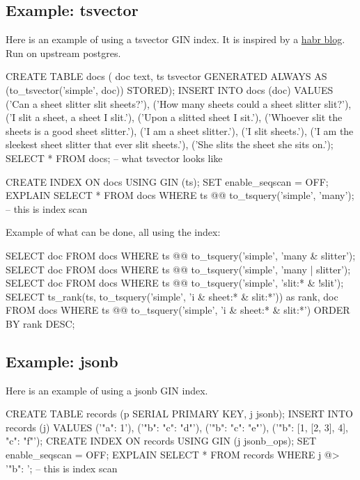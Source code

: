 \documentclass[11pt]{article}
\begin{document}
\hypertarget{example-tsvector}{%
\subsection{Example: tsvector}\label{example-tsvector}}

Here is an example of using a tsvector GIN index. It is inspired by a
\href{https://habr.com/en/company/postgrespro/blog/448746/}{habr blog}.
Run on upstream postgres.

\begin{sqlcode}
CREATE TABLE docs (
    doc text,
    ts tsvector GENERATED ALWAYS AS (to_tsvector('simple', doc)) STORED);
INSERT INTO docs (doc) VALUES
  ('Can a sheet slitter slit sheets?'),
  ('How many sheets could a sheet slitter slit?'),
  ('I slit a sheet, a sheet I slit.'),
  ('Upon a slitted sheet I sit.'),
  ('Whoever slit the sheets is a good sheet slitter.'),
  ('I am a sheet slitter.'),
  ('I slit sheets.'),
  ('I am the sleekest sheet slitter that ever slit sheets.'),
  ('She slits the sheet she sits on.');
SELECT * FROM docs; -- what tsvector looks like
\end{sqlcode}

\begin{sqlcode}
CREATE INDEX ON docs USING GIN (ts);
SET enable_seqscan = OFF;
EXPLAIN SELECT * FROM docs
    WHERE ts @@ to_tsquery('simple', 'many'); -- this is index scan
\end{sqlcode}

Example of what can be done, all using the index:

\begin{sqlcode}
SELECT doc FROM docs WHERE ts @@ to_tsquery('simple', 'many & slitter');
SELECT doc FROM docs WHERE ts @@ to_tsquery('simple', 'many | slitter');
SELECT doc FROM docs WHERE ts @@ to_tsquery('simple', 'slit:* & !slit');
SELECT ts_rank(ts, to_tsquery('simple', 'i & sheet:* & slit:*')) as rank, doc
    FROM docs
    WHERE ts @@ to_tsquery('simple', 'i & sheet:* & slit:*')
    ORDER BY rank DESC;
\end{sqlcode}

\hypertarget{example-jsonb}{%
\subsection{Example: jsonb}\label{example-jsonb}}

Here is an example of using a jsonb GIN index.

\begin{sqlcode}
CREATE TABLE records (p SERIAL PRIMARY KEY, j jsonb);
INSERT INTO records (j) VALUES
  ('{"a": 1}'),
  ('{"b": {"c": "d"}}'),
  ('{"b": {"c": "e"}}'),
  ('{"b": [1, [2, 3], 4], "c": "f"}');
CREATE INDEX ON records USING GIN (j jsonb_ops);
SET enable_seqscan = OFF;
EXPLAIN SELECT * FROM records WHERE j @> '{"b": {}}'; -- this is index scan
\end{sqlcode}
\end{document}
